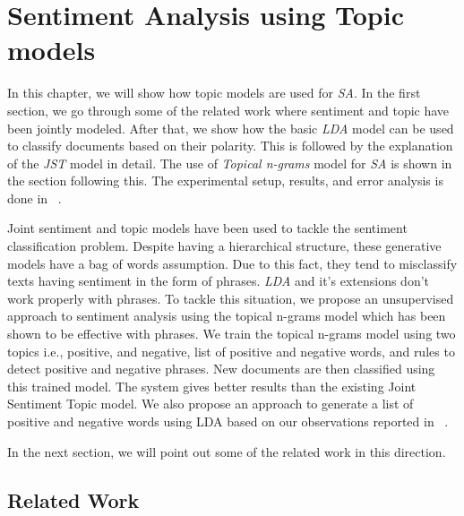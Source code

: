 
\chapter{Sentiment Analysis using Topic models} %

\label{topicmodeledsa} %



In this chapter, we will show how topic models are used for \textit{SA}. In the first section, we go through some of the related work where sentiment and topic have
been jointly modeled. After that, we show how the basic \textit{LDA} model can be used  to classify documents based on their polarity.  This is followed by the 
explanation of the \textit{JST} model in detail. The use of \textit{Topical n-grams} model for \textit{SA} is shown in the section following this. The experimental
setup, results, and error analysis is done in ~.

Joint sentiment and topic models have been used to tackle the sentiment classification problem. Despite having a hierarchical structure, these generative models have 
a bag of words assumption. Due to this fact, they tend to misclassify texts having sentiment in the form of phrases. \textit{LDA} and it's extensions don't work properly
with phrases. To tackle this situation, we propose an unsupervised approach to sentiment analysis using the topical n-grams model which has been shown to be effective 
with phrases. We train the topical n-grams model using two topics i.e., positive, and negative, list of positive and negative words, and rules to detect positive and 
negative phrases. New documents are then classified using this trained model. The system gives better results than the existing Joint Sentiment Topic model. We also propose
an approach to generate a list of positive and negative words using LDA based on our observations reported in ~.

In the next section, we will point out some of the related work in this direction.

\section{Related Work}

